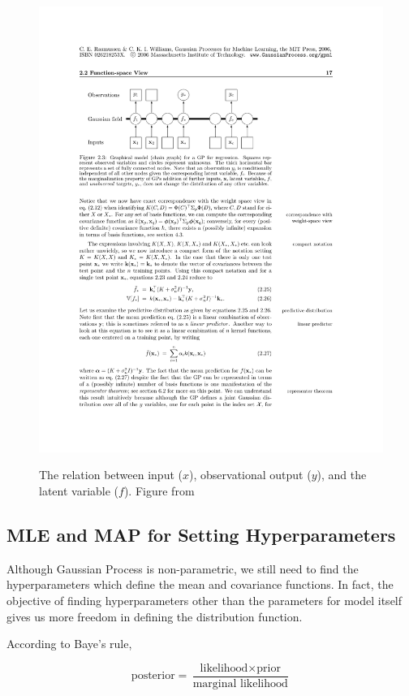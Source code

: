 \documentclass[11pt]{report}
\numberwithin{equation}{chapter}
\begin{document}
\begin{spacing}{2}
\begin{figure}[h]
\centering
\includegraphics[scale=1.0]{Regression_model.pdf}
\label{regression_model}
\caption{The relation between input ($x$), observational output ($y$), and the latent variable ($f$). \newline Figure from \cite{RW}}
\end{figure}


\subsection{MLE and MAP for Setting Hyperparameters}
Although Gaussian Process is non-parametric, we still need to find the hyperparameters which define the mean and covariance functions. In fact, the objective of finding hyperparameters other than the parameters for model itself gives us more freedom in defining the distribution function. 

According to Baye's rule,

\[\mbox{posterior} = \frac{\mbox{likelihood}\times \mbox{prior}}{\mbox{marginal likelihood}}\]


\end{spacing}
\end{document}
